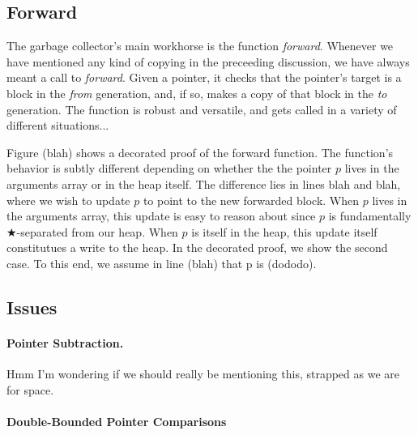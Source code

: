 \subsection{Forward}
\label{sec:gcforward}
The garbage collector's main workhorse is the function \emph{forward}.
Whenever we have mentioned any kind of copying in the preceeding 
discussion, we have always meant a call to \emph{forward}. 
Given a pointer, it checks that the pointer's target is a block
in the \emph{from} generation, and, if so, 
makes a copy of that block in the \emph{to} generation. The function 
is robust and versatile, and gets called in a variety of different 
situations... 

Figure (blah) shows a decorated proof of the forward function.
The function's behavior is subtly different depending on 
whether the the pointer $p$ lives in the arguments array or in the 
heap itself. The difference lies in lines blah and blah, where 
we wish to update $p$ to point to the new forwarded block. 
When $p$ lives in the arguments array, this update is easy to 
reason about since $p$ is fundamentally $\bigstar$-separated from our heap. 
When $p$ is itself in the heap, this update itself constitutues a
write to the heap. In the decorated proof, we show the second 
case. To this end, we assume in line (blah) that p is (dododo). 



\subsection{Issues}
\label{sec:gccsemantics}

\paragraph{Pointer Subtraction.}
{\color{blue}Hmm I'm wondering if we should really be mentioning this,
strapped as we are for space.}


\paragraph{Double-Bounded Pointer Comparisons}







